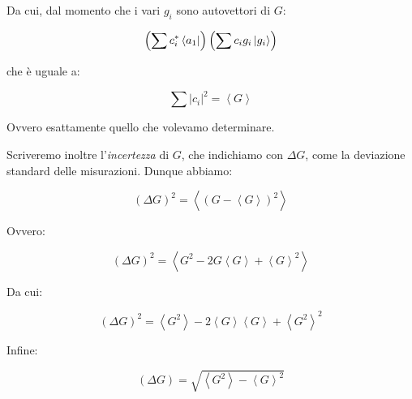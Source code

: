 Da cui, dal momento che i vari $g_i$ sono autovettori di $G$:

	\begin{equation}
		\left ( \sum c_i^* \bra{a_1} \right ) \left ( \sum c_i g_i \ket{g_i} \right )
	\end{equation}

che \`e uguale a:

	\begin{equation}
		\sum \left | c_i \right | ^2 = \left \langle G \right \rangle
	\end{equation}

Ovvero esattamente quello che volevamo determinare.

Scriveremo inoltre l'\textit{incertezza} di $G$, che indichiamo con $\Delta G$, come la deviazione standard delle misurazioni. Dunque abbiamo:

	\begin{equation}
		(\Delta G)^2 = \left \langle (G - \left \langle G \right \rangle) ^2 \right \rangle
	\end{equation}

Ovvero:

	\begin{equation}
		(\Delta G)^2 = \left \langle G^2 - 2 G \left \langle G \right \rangle + \left \langle G \right \rangle ^2 \right \rangle
	\end{equation}

Da cui:

	\begin{equation}
		(\Delta G)^2 = \left \langle G^2 \right \rangle - 2 \left \langle G \right \rangle \left \langle G \right \rangle + \left \langle G^2 \right \rangle^2
	\end{equation}

Infine:

	\begin{equation}
		(\Delta G) = \sqrt{ \left \langle G^2 \right \rangle - \left \langle G \right \rangle ^ 2 }
	\end{equation}
